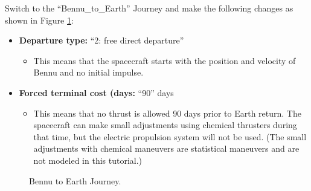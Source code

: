 \documentclass[11pt]{article}
\begin{document}
\noindent Switch to the ``Bennu\_to\_Earth'' Journey and make the following changes as shown in Figure \ref{fig:bennu_to_earth_journey_options}:

\begin{itemize}
	\item \textbf{Departure type:} ``2: free direct departure''
	\begin{itemize}
		\item This means that the spacecraft starts with the position and velocity of Bennu and no initial impulse.
	\end{itemize}
	\item \textbf{Forced terminal cost (days:} ``90'' days
	\begin{itemize}
		\item This means that no thrust is allowed 90 days prior to Earth return. The spacecraft can make small adjustments using chemical thrusters during that time, but the electric propulsion system will not be used. (The small adjustments with chemical maneuvers are statistical maneuvers and are not modeled in this tutorial.)
	\end{itemize}
\end{itemize}

\begin{figure}[H]
	\centering
	\caption{\label{fig:bennu_to_earth_journey_options}Bennu to Earth Journey.}
\end{figure}
\end{document}

